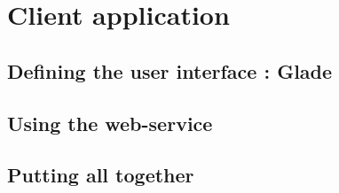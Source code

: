 
\section{Client application}
\label{app}

\subsection{Defining the user interface : Glade}

\subsection{Using the web-service}

\subsection{Putting all together}


